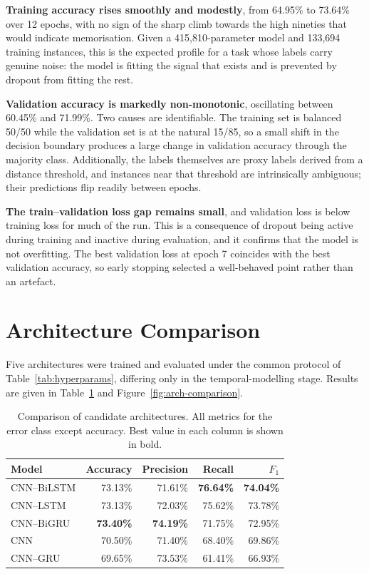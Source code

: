 \textbf{Training accuracy rises smoothly and modestly}, from 64.95\% to 73.64\%
over 12 epochs, with no sign of the sharp climb towards the high nineties that
would indicate memorisation. Given a 415{,}810-parameter model and 133{,}694
training instances, this is the expected profile for a task whose labels carry
genuine noise: the model is fitting the signal that exists and is prevented by
dropout from fitting the rest.

\textbf{Validation accuracy is markedly non-monotonic}, oscillating between
60.45\% and 71.99\%. Two causes are identifiable. The training set is balanced
50/50 while the validation set is at the natural 15/85, so a small shift in the
decision boundary produces a large change in validation accuracy through the
majority class. Additionally, the labels themselves are proxy labels derived
from a distance threshold, and instances near that threshold are intrinsically
ambiguous; their predictions flip readily between epochs.

\textbf{The train--validation loss gap remains small}, and validation loss is
below training loss for much of the run. This is a consequence of dropout being
active during training and inactive during evaluation, and it confirms that the
model is not overfitting. The best validation loss at epoch 7 coincides with the
best validation accuracy, so early stopping selected a well-behaved point rather
than an artefact.

\section{Architecture Comparison}
\label{sec:arch-comparison}

Five architectures were trained and evaluated under the common protocol of
Table~\ref{tab:hyperparams}, differing only in the temporal-modelling stage.
Results are given in Table~\ref{tab:arch-comparison} and
Figure~\ref{fig:arch-comparison}.

\begin{table}[H]
\centering
\caption[Architecture comparison]{Comparison of candidate architectures. All
metrics for the error class except accuracy. Best value in each column is
shown in bold.}
\label{tab:arch-comparison}
\begin{tabular}{@{}lrrrr@{}}
\toprule
\textbf{Model} & \textbf{Accuracy} & \textbf{Precision} & \textbf{Recall} & \textbf{$F_1$} \\
\midrule
CNN--BiLSTM & 73.13\% & 71.61\% & \textbf{76.64\%} & \textbf{74.04\%} \\
CNN--LSTM   & 73.13\% & 72.03\% & 75.62\%          & 73.78\% \\
CNN--BiGRU  & \textbf{73.40\%} & \textbf{74.19\%} & 71.75\% & 72.95\% \\
CNN         & 70.50\% & 71.40\% & 68.40\%          & 69.86\% \\
CNN--GRU    & 69.65\% & 73.53\% & 61.41\%          & 66.93\% \\
\bottomrule
\end{tabular}
\end{table}


